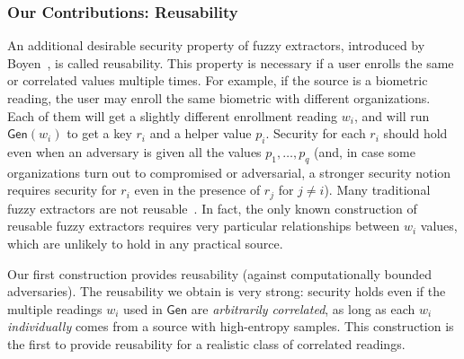 \documentclass[11pt]{article}
\renewcommand{\paragraph}[1]{\subsubsection{#1}}
\newcommand{\consref}[1]{\mbox{Construction~\ref{#1}}}
\newcommand{\class}[1]{{\ensuremath{\mathsf{#1}}}}
\newcommand{\gen}{\ensuremath{\class{Gen}}\xspace}
\begin{document}
\paragraph{Our Contributions: Reusability}
An additional desirable security property of fuzzy extractors, introduced by Boyen~\cite{Boyen2004}, is called reusability. This property is necessary if a user enrolls the same or correlated values multiple times. For example, if the source is a biometric reading, the user may enroll the same biometric with different organizations.  Each of them will get a slightly different enrollment reading $w_i$, and will run $\gen(w_i)$ to get a key $r_i$ and a helper value $p_i$. Security for each $r_i$ should hold even when an adversary is given all the values $p_1, \dots, p_q$ (and, in case some organizations turn out to compromised or adversarial, a stronger security notion requires security for $r_i$ even in the presence of $r_j$ for $j\neq i$).  Many traditional fuzzy extractors are not reusable~\cite{Boyen2004,simoens2009privacy,blanton2012non,blanton2013analysis}. In fact, the only known construction of reusable fuzzy extractors \cite{Boyen2004} requires very particular relationships between $w_i$ values, which are unlikely to hold in any practical source.

Our first construction provides reusability (against computationally bounded adversaries).  
The reusability we obtain is very strong:  security holds even if the multiple readings $w_i$ used in $\gen$ are \emph{arbitrarily correlated}, as long as each $w_i$ \emph{individually} comes from a source with high-entropy samples. This construction is the first to provide reusability for a realistic class of correlated readings.
 





\end{document}
